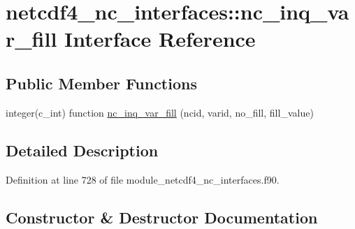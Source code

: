 \hypertarget{interfacenetcdf4__nc__interfaces_1_1nc__inq__var__fill}{}\section{netcdf4\+\_\+nc\+\_\+interfaces\+:\+:nc\+\_\+inq\+\_\+var\+\_\+fill Interface Reference}
\label{interfacenetcdf4__nc__interfaces_1_1nc__inq__var__fill}
\subsection*{Public Member Functions}
\begin{DoxyCompactItemize}
\item 
integer(c\+\_\+int) function \hyperlink{interfacenetcdf4__nc__interfaces_1_1nc__inq__var__fill_a6720d8168befa9c040d12590c228c376}{nc\+\_\+inq\+\_\+var\+\_\+fill} (ncid, varid, no\+\_\+fill, fill\+\_\+value)
\end{DoxyCompactItemize}


\subsection{Detailed Description}


Definition at line 728 of file module\+\_\+netcdf4\+\_\+nc\+\_\+interfaces.\+f90.



\subsection{Constructor \& Destructor Documentation}
\mbox{\label{interfacenetcdf4__nc__interfaces_1_1nc__inq__var__fill_a6720d8168befa9c040d12590c228c376}} 
